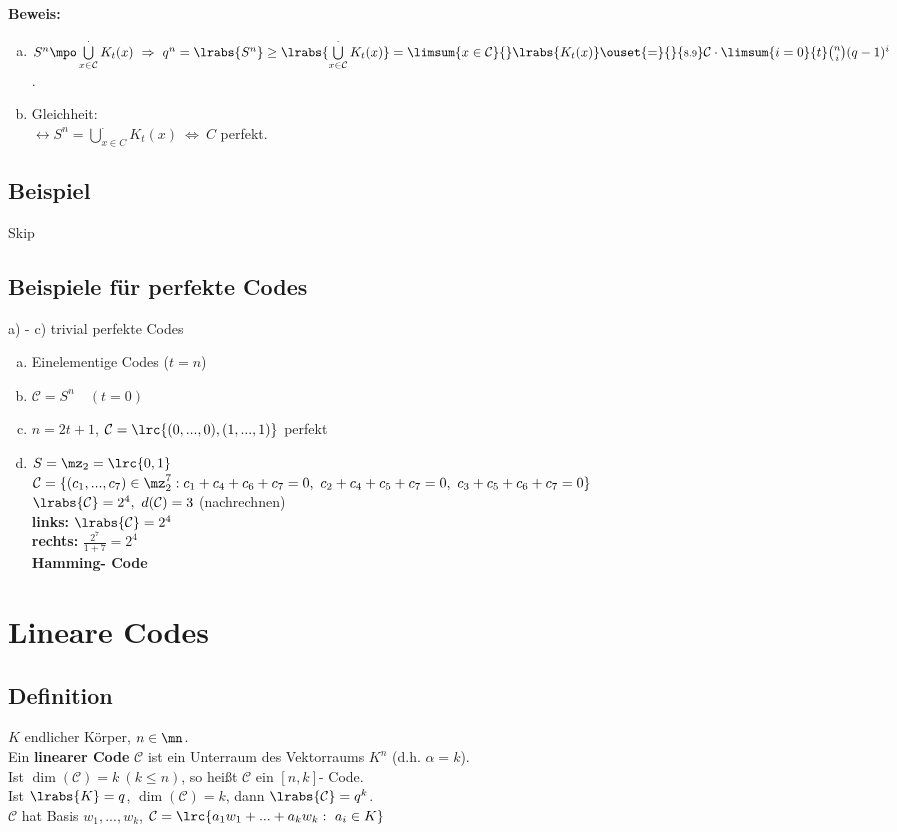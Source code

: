 		\textbf{Beweis:}
		\begin{enumerate}[a)]
			\item $ S^n\mpo\bigcup\limits_{x\in\mathcal{C}}^{\cdot} K_t(x)\ \Rightarrow\ q^n=\lrabs{S^n}\geq\lrabs{\bigcup\limits_{x\in\mathcal{C}}^{\cdot}K_t(x)}=\limsum{x\in\mathcal{C}}{}\lrabs{K_t(x)}\ouset{=}{}{\mbox{\scriptsize 8.9}}\mathcal{C}\cdot\limsum{i=0}{t}\binom{n}{i}(q-1)^i $.
			\item  Gleichheit:\\
			$ \leftrightarrow S^n=\bigcup\limits_{x\in C}^{\cdot}K_t(x)\ \Leftrightarrow\ C $ perfekt.
		\end{enumerate}
	
	\subsection{Beispiel}
		Skip
		
	\subsection{Beispiele für perfekte Codes}
		a) - c) trivial perfekte Codes
		\begin{enumerate}[a)]
			\item Einelementige Codes ($ t=n $)
			\item $ \mathcal{C}=S^n\quad (t=0) $
			\item  $ n=2t+1 $, $ \mathcal{C}=\lrc{(0,...,0),(1,...,1)} $ perfekt
			\item $ S=\mz_2=\lrc{0,1} $\\
			$ \mathcal{C}=\{(c_1,...,c_7)\in\mz_2^7:c_1+c_4+c_6+c_7=0,\ c_2+c_4+c_5+c_7=0,\  c_3+c_5+c_6+c_7=0\} $\\
			$ \lrabs{\mathcal{C}}=2^4,\ d(\mathcal{C})=3 $ (nachrechnen)\\
			\textbf{links:} $ \lrabs{\mathcal{C}}=2^4 $\\
			\textbf{rechts:} $ \frac{2^7}{1+7}=2^4 $\\
			\textbf{Hamming- Code}
		\end{enumerate}
		
\section{Lineare Codes}
	\subsection{Definition}
		$ K $ endlicher Körper, $ n\in\mn $.\\
		Ein \textbf{linearer Code} $ \mathcal{C} $ ist ein Unterraum des Vektorraums $ K^n $ (d.h. $\alpha=k $).\\
		Ist $ \dim(\mathcal{C})=k\ (k\leq n) $, so heißt $ \mathcal{C} $ ein $ [n,k] $- Code.\\
		Ist $ \lrabs{K}=q $, $ \dim(\mathcal{C})=k $, dann $ \lrabs{\mathcal{C}}=q^k $.\\
		$ \mathcal{C} $ hat Basis $ w_1,...,w_k $, $ \mathcal{C}=\lrc{a_1w_1+...+a_kw_k:\ a_i\in K} $
	
